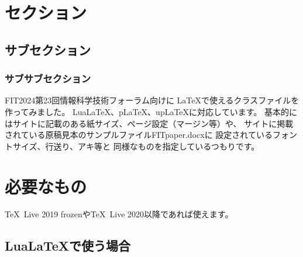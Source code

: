 \documentclass{FITpaper}
\begin{document}
\maketitle

\section{セクション}
\subsection{サブセクション}
\subsubsection{サブサブセクション}

FIT2024第23回情報科学技術フォーラム\cite{fit2024}向けに
\LaTeX で使えるクラスファイル\cite{fitpaper-class}を作ってみました。
Lua\LaTeX 、p\LaTeX 、up\LaTeX に対応しています。
基本的にはサイトに記載のある紙サイズ、ページ設定（マージン等）や、
サイトに掲載されている原稿見本のサンプルファイルFITpaper.docxに
設定されているフォントサイズ、行送り、アキ等と
同様なものを指定しているつもりです。

\section{必要なもの}

\TeX~Live 2019 frozenや\TeX~Live 2020以降であれば使えます。

\subsection{Lua\LaTeX で使う場合}
\end{document}
